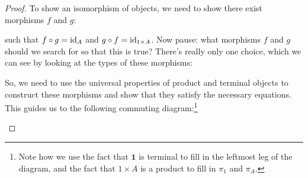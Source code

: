 \begin{proof}
  To show an isomorphism of objects, we need to show there exist
  morphisms $f$ and $g$:
  \begin{center}
  \end{center}
  such that $f \circ g = \operatorname{id}_A$ and $g \circ f = \operatorname{id}_{1 \times A}$.
  Now pause: what morphisms $f$ and $g$ should we search for so that this is true? There's
  really only one choice, which we can see by looking at the types of these morphisms:
  \begin{center}
  \end{center}

  So, we need to use the universal properties of product and terminal objects to
  construct these morphisms and show that they satisfy the necessary equations.
  This guides us to the following commuting diagram:\footnote{Note how we use
  the fact that $\mathbf{1}$ is terminal to fill in the leftmost leg of the diagram,
  and the fact that $1 \times A$ is a product to fill in $\pi_1$ and $\pi_A$.}

  \begin{center}
  \end{center}


\end{proof}
